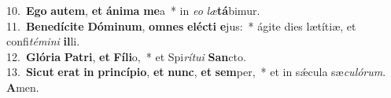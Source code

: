 {10.~}\textbf{E}\textbf{go} \textbf{au}\textbf{tem}, \textbf{et} \textbf{á}\textbf{ni}\textbf{ma} \textbf{me}a~* in \textit{e}\textit{o} \textit{læ}\textbf{tá}bimur.\\
{11.~}\textbf{Be}\textbf{ne}\textbf{dí}\textbf{ci}\textbf{te} \textbf{Dó}\textbf{mi}\textbf{num}, \textbf{om}\textbf{nes} \textbf{e}\textbf{lé}\textbf{cti} \textbf{e}jus:~* ágite dies lætítiæ, et confi\textit{té}\textit{mi}\textit{ni} \textbf{il}li.\\
{12.~}\textbf{Gló}\textbf{ri}\textbf{a} \textbf{Pa}\textbf{tri}, \textbf{et} \textbf{Fí}\textbf{li}o,~* et Spi\textit{rí}\textit{tu}\textit{i} \textbf{San}cto.\\
{13.~}\textbf{Si}\textbf{cut} \textbf{e}\textbf{rat} \textbf{in} \textbf{prin}\textbf{cí}\textbf{pi}\textbf{o}, \textbf{et} \textbf{nunc}, \textbf{et} \textbf{sem}per,~* et in sǽcula sæ\textit{cu}\textit{ló}\textit{rum}. \textbf{A}men.\\
